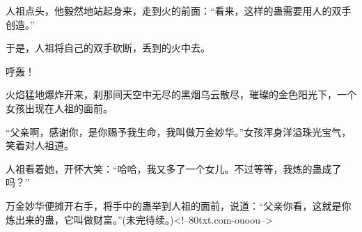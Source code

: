 \begin{this_body}
人祖点头，他毅然地站起身来，走到火的前面：“看来，这样的蛊需要用人的双手创造。”

于是，人祖将自己的双手砍断，丢到的火中去。

呼轰！

火焰猛地爆炸开来，刹那间天空中无尽的黑烟乌云散尽，璀璨的金色阳光下，一个女孩出现在人祖的面前。

“父亲啊，感谢你，是你赐予我生命，我叫做万金妙华。”女孩浑身洋溢珠光宝气，笑着对人祖道。

人祖看着她，开怀大笑：“哈哈，我又多了一个女儿。不过等等，我炼的蛊成了吗？”

万金妙华便摊开右手，将手中的蛊举到人祖的面前，说道：“父亲你看，这就是你炼出来的蛊，它叫做财富。”(未完待续。)<!--80txt.com-ouoou-->

\end{this_body}

